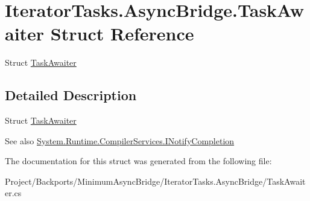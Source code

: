 \hypertarget{struct_iterator_tasks_1_1_async_bridge_1_1_task_awaiter}{}\section{Iterator\+Tasks.\+Async\+Bridge.\+Task\+Awaiter Struct Reference}
\label{struct_iterator_tasks_1_1_async_bridge_1_1_task_awaiter}


Struct \hyperlink{struct_iterator_tasks_1_1_async_bridge_1_1_task_awaiter}{Task\+Awaiter}  




\subsection{Detailed Description}
Struct \hyperlink{struct_iterator_tasks_1_1_async_bridge_1_1_task_awaiter}{Task\+Awaiter} 

\begin{DoxySeeAlso}{See also}
\hyperlink{interface_system_1_1_runtime_1_1_compiler_services_1_1_i_notify_completion}{System.\+Runtime.\+Compiler\+Services.\+I\+Notify\+Completion}


\end{DoxySeeAlso}


The documentation for this struct was generated from the following file\+:\begin{DoxyCompactItemize}
\item 
Project/\+Backports/\+Minimum\+Async\+Bridge/\+Iterator\+Tasks.\+Async\+Bridge/Task\+Awaiter.\+cs\end{DoxyCompactItemize}
